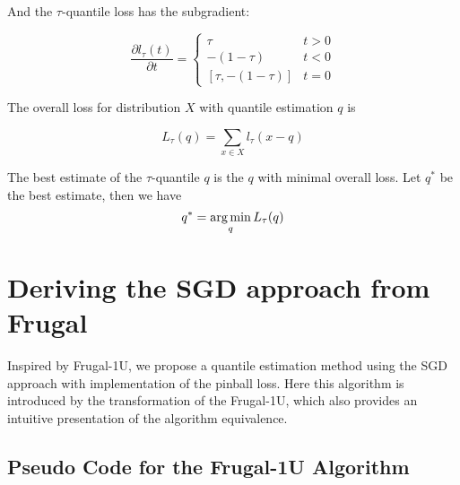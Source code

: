 And the $\tau$-quantile loss has the {\color{red} subgradient}:

\begin{equation}
    \frac {\partial l_\tau(t)}{\partial t}= 
        \begin{cases}
            \tau                & t > 0\\
            -(1-\tau)           & t < 0\\
            [\tau, -(1 - \tau)] & t = 0
        \end{cases}
\end{equation}



The overall loss for distribution $X$ with quantile estimation $q$ is

\begin{equation}
    L_{\tau}(q) = \sum_{x \in X} l_{\tau}(x - q)
\end{equation}


The best estimate of the $\tau$-quantile $q$ is the $q$ with minimal overall loss. 
Let $q^\ast$ be the best estimate, then we have
\begin{equation}
    q^\ast = \operatorname*{arg\,min}_{q} L_{\tau}(q)
\end{equation}



\section{Deriving the SGD approach from Frugal}
\label{sec: derive_sgd}
Inspired by Frugal-1U\cite{maFrugalStreamingEstimating2014}, we propose a quantile estimation method using the SGD approach with implementation of the pinball loss. Here this algorithm is introduced by the transformation of the Frugal-1U, which also provides an intuitive presentation of the algorithm equivalence. 

\subsection{Pseudo Code for the Frugal-1U Algorithm}

